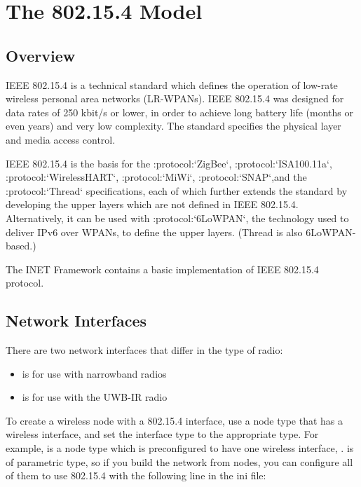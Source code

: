 \chapter{The 802.15.4 Model}
\label{cha:802154}

\section{Overview}
\label{sec:802154:overview}

IEEE 802.15.4 is a technical standard which defines the operation of low-rate
wireless personal area networks (LR-WPANs). IEEE 802.15.4 was designed for data
rates of 250 kbit/s or lower, in order to achieve long battery life (months or
even years) and very low complexity. The standard specifies the physical layer
and media access control.

IEEE 802.15.4 is the basis for the :protocol:`ZigBee`, :protocol:`ISA100.11a`,
:protocol:`WirelessHART`, :protocol:`MiWi`, :protocol:`SNAP`,and the
:protocol:`Thread` specifications, each of which further extends the standard by
developing the upper layers which are not defined in IEEE 802.15.4.
Alternatively, it can be used with :protocol:`6LoWPAN`, the technology used to
deliver IPv6 over WPANs, to define the upper layers. (Thread is also 6LoWPAN-based.)

The INET Framework contains a basic implementation of IEEE 802.15.4 protocol.


\section{Network Interfaces}
\label{sec:802154:network-interfaces}

There are two network interfaces that differ in the type of radio:

\begin{itemize}
  \item {} is for use with narrowband radios
  \item {} is for use with the UWB-IR radio
\end{itemize}


To create a wireless node with a 802.15.4 interface, use a node type
that has a wireless interface, and set the interface type to the
appropriate type. For example,  is a node type
which is preconfigured to have one wireless interface, .
 is of parametric type, so if you build the network from
 nodes, you can configure all of them to use
802.15.4 with the following line in the ini file:

